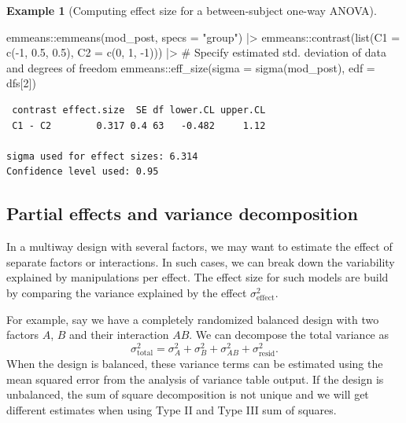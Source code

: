 \documentclass[
  11pt,
  letterpaper,
]{scrbook}
\newenvironment{Shaded}{\begin{snugshade}}{\end{snugshade}}
\newcommand{\AttributeTok}[1]{\textcolor[rgb]{0.40,0.45,0.13}{#1}}
\newcommand{\CommentTok}[1]{\textcolor[rgb]{0.37,0.37,0.37}{#1}}
\newcommand{\DecValTok}[1]{\textcolor[rgb]{0.68,0.00,0.00}{#1}}
\newcommand{\FloatTok}[1]{\textcolor[rgb]{0.68,0.00,0.00}{#1}}
\newcommand{\FunctionTok}[1]{\textcolor[rgb]{0.28,0.35,0.67}{#1}}
\newcommand{\NormalTok}[1]{\textcolor[rgb]{0.00,0.23,0.31}{#1}}
\newcommand{\SpecialCharTok}[1]{\textcolor[rgb]{0.37,0.37,0.37}{#1}}
\newcommand{\StringTok}[1]{\textcolor[rgb]{0.13,0.47,0.30}{#1}}
\theoremstyle{definition}
\newtheorem{example}{Example}[chapter]
\theoremstyle{remark}
\begin{document}
\begin{example}[Computing effect size for a between-subject one-way
ANOVA]
\begin{Shaded}
\begin{Highlighting}[]
\NormalTok{emmeans}\SpecialCharTok{::}\FunctionTok{emmeans}\NormalTok{(mod\_post, }\AttributeTok{specs =} \StringTok{"group"}\NormalTok{) }\SpecialCharTok{|\textgreater{}} 
\NormalTok{  emmeans}\SpecialCharTok{::}\FunctionTok{contrast}\NormalTok{(}\FunctionTok{list}\NormalTok{(}\AttributeTok{C1 =} \FunctionTok{c}\NormalTok{(}\SpecialCharTok{{-}}\DecValTok{1}\NormalTok{, }\FloatTok{0.5}\NormalTok{, }\FloatTok{0.5}\NormalTok{), }
                         \AttributeTok{C2 =} \FunctionTok{c}\NormalTok{(}\DecValTok{0}\NormalTok{, }\DecValTok{1}\NormalTok{, }\SpecialCharTok{{-}}\DecValTok{1}\NormalTok{))) }\SpecialCharTok{|\textgreater{}}
\CommentTok{\# Specify estimated std. deviation of data and degrees of freedom }
\NormalTok{  emmeans}\SpecialCharTok{::}\FunctionTok{eff\_size}\NormalTok{(}\AttributeTok{sigma =} \FunctionTok{sigma}\NormalTok{(mod\_post), }\AttributeTok{edf =}\NormalTok{ dfs[}\DecValTok{2}\NormalTok{])}
\end{Highlighting}
\end{Shaded}

\begin{verbatim}
 contrast effect.size  SE df lower.CL upper.CL
 C1 - C2        0.317 0.4 63   -0.482     1.12

sigma used for effect sizes: 6.314 
Confidence level used: 0.95 
\end{verbatim}

\end{example}

\hypertarget{partial-effects-and-variance-decomposition}{%
\subsection{Partial effects and variance
decomposition}\label{partial-effects-and-variance-decomposition}}

In a multiway design with several factors, we may want to estimate the
effect of separate factors or interactions. In such cases, we can break
down the variability explained by manipulations per effect. The effect
size for such models are build by comparing the variance explained by
the effect \(\sigma^2_{\text{effect}}\).

For example, say we have a completely randomized balanced design with
two factors \(A\), \(B\) and their interaction \(AB\). We can decompose
the total variance as
\[\sigma^2_{\text{total}} = \sigma^2_A + \sigma^2_B + \sigma^2_{AB} + \sigma^2_{\text{resid}}.\]
When the design is balanced, these variance terms can be estimated using
the mean squared error from the analysis of variance table output. If
the design is unbalanced, the sum of square decomposition is not unique
and we will get different estimates when using Type II and Type III sum
of squares.
\end{document}
